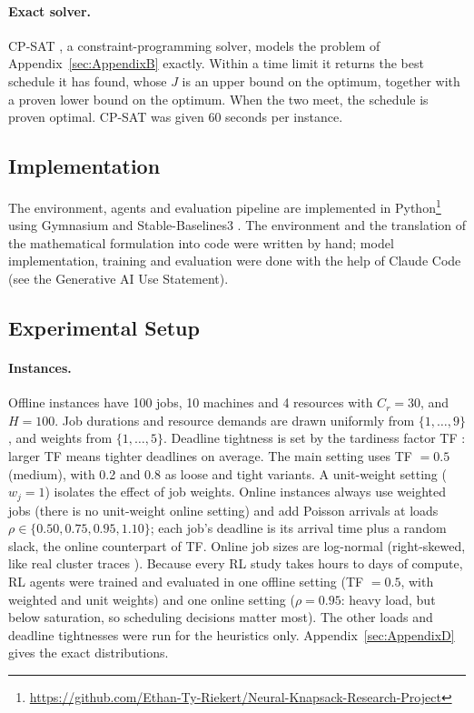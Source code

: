 \documentclass[12pt]{article}
\begin{document}
\paragraph{Exact solver.} CP-SAT \cite{ortools}, a constraint-programming solver, models the problem of Appendix~\ref{sec:AppendixB} exactly. Within a time limit it returns the best schedule it has found, whose $J$ is an upper bound on the optimum, together with a proven lower bound on the optimum. When the two meet, the schedule is proven optimal. CP-SAT was given 60 seconds per instance.

\subsection{Implementation}\label{sec:implementation}
The environment, agents and evaluation pipeline are implemented in Python\footnote{\url{https://github.com/Ethan-Ty-Riekert/Neural-Knapsack-Research-Project}} using Gymnasium and Stable-Baselines3 \cite{raffin2021sb3}. The environment and the translation of the mathematical formulation into code were written by hand; model implementation, training and evaluation were done with the help of Claude Code (see the Generative AI Use Statement).

\subsection{Experimental Setup}\label{sec:setup}
\paragraph{Instances.} Offline instances have 100 jobs, 10 machines and 4 resources with $C_r = 30$, and $H = 100$. Job durations and resource demands are drawn uniformly from $\{1, \dots, 9\}$, and weights from $\{1, \dots, 5\}$. Deadline tightness is set by the tardiness factor TF \cite{potts1985wtardiness}: larger TF means tighter deadlines on average. The main setting uses TF $= 0.5$ (medium), with 0.2 and 0.8 as loose and tight variants. A unit-weight setting ($w_j = 1$) isolates the effect of job weights. Online instances always use weighted jobs (there is no unit-weight online setting) and add Poisson arrivals at loads $\rho \in \{0.50, 0.75, 0.95, 1.10\}$; each job's deadline is its arrival time plus a random slack, the online counterpart of TF. Online job sizes are log-normal (right-skewed, like real cluster traces \cite{reiss2012googletrace, cortez2017resourcecentral}). Because every RL study takes hours to days of compute, RL agents were trained and evaluated in one offline setting (TF $= 0.5$, with weighted and unit weights) and one online setting ($\rho = 0.95$: heavy load, but below saturation, so scheduling decisions matter most). The other loads and deadline tightnesses were run for the heuristics only. Appendix~\ref{sec:AppendixD} gives the exact distributions.
\end{document}
